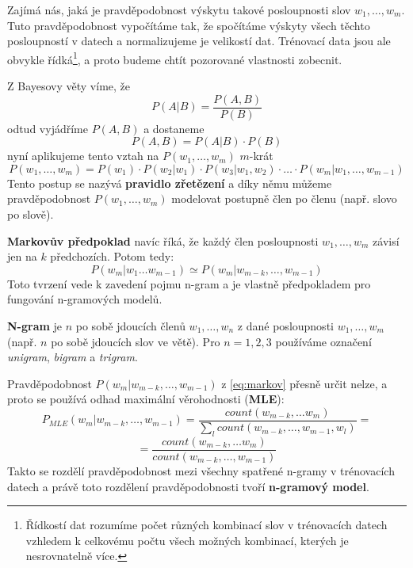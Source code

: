 \documentclass[12pt,a4paper]{report}
\begin{document}
Zajímá nás, jaká je pravděpodobnost výskytu takové posloupnosti slov $w_{1},\ldots,w_{m}$. Tuto pravděpodobnost vypočítáme tak, že spočítáme výskyty všech těchto posloupností v datech a normalizujeme je velikostí dat. Trénovací data jsou ale obvykle řídká\footnote{Řídkostí dat rozumíme počet různých kombinací slov v trénovacích datech vzhledem k celkovému počtu všech možných kombinací, kterých je nesrovnatelně více.}, a proto budeme chtít pozorované vlastnosti zobecnit.

Z Bayesovy věty víme, že
\begin{equation}
P(A|B) = \frac{P(A,B)}{P(B)}
\end{equation}
odtud vyjádříme $P(A,B)$ a dostaneme
\begin{equation}
P(A,B) = P(A|B) \cdot P(B)
\end{equation}
nyní aplikujeme tento vztah na $P(w_{1},\ldots,w_{m})$ $m$-krát
\begin{equation}
P(w_{1},\ldots,w_{m}) = P(w_{1}) \cdot P(w_{2}|w_{1}) \cdot P(w_{3}|w_{1},w_{2}) \cdot \ldots \cdot P(w_{m}|w_{1},\ldots,w_{m-1})
\end{equation}
Tento postup se nazývá \textbf{pravidlo zřetězení} a díky němu můžeme pravděpodobnost $P(w_{1},\ldots,w_{m})$ modelovat postupně člen po členu (např. slovo po slově).

\textbf{Markovův předpoklad} navíc říká, že každý člen posloupnosti $w_{1},\ldots,w_{m}$ závisí jen na $k$ předchozích. Potom tedy:
\begin{equation}\label{eq:markov}
P(w_{m}|w_{1} \ldots w_{m-1}) \simeq P(w_{m}|w_{m-k}, \ldots, w_{m-1})
\end{equation}
Toto tvrzení vede k zavedení pojmu n-gram a je vlastně předpokladem pro fungování n-gramových modelů.

\textbf{N-gram} je $n$ po sobě jdoucích členů $w_{1},\ldots,w_{n}$ z dané posloupnosti $w_{1},\ldots,w_{m}$ (např. $n$ po sobě jdoucích slov ve větě). Pro $n = 1, 2, 3$ používáme označení \textit{unigram}, \textit{bigram} a \textit{trigram}.

Pravděpodobnost $P(w_{m}|w_{m-k}, \ldots, w_{m-1})$ z \eqref{eq:markov} přesně určit nelze, a proto se používá odhad maximální věrohodnosti (\textbf{MLE}):
\begin{equation}\label{eq:pmle}
P_{MLE}(w_{m}|w_{m-k}, \ldots, w_{m-1}) = \frac{count(w_{m-k}, \ldots w_{m})}{\sum_{l} count(w_{m-k},\ldots,w_{m-1}, w_{l})} =
\end{equation}
\begin{equation}\nonumber
= \frac{count(w_{m-k}, \ldots w_{m})}{count(w_{m-k},\ldots,w_{m-1})}
\end{equation}
Takto se rozdělí pravděpodobnost mezi všechny spatřené n-gramy v trénovacích datech a právě toto rozdělení pravděpodobnosti tvoří \textbf{n-gramový model}.
\end{document}
